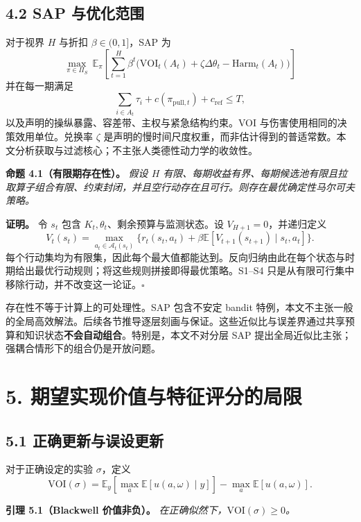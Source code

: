 \documentclass[
  chinese,
  11pt]{article}
\begin{document}
\subsection{4.2 SAP 与优化范围}\label{sap-ux4e0eux4f18ux5316ux8303ux56f4}

对于视界 \(H\) 与折扣 \(\beta\in(0,1]\)，SAP 为 \[
\max_{\pi\in\Pi_S}\ \mathbb E_\pi\!\left[\sum_{t=1}^{H}\beta^t
\big(\mathrm{VOI}_t(A_t)+\zeta\Delta\theta_t-\mathrm{Harm}_t(A_t)\big)\right]
\tag{1}
\] 并在每一期满足 \[
\sum_{i\in A_t}\tau_i+c(\pi_{\mathrm{pull},t})+c_{\mathrm{ref}}\leq T,
\tag{2}
\] 以及声明的操纵暴露、容差带、主权与紧急结构约束。VOI 与伤害使用相同的决策效用单位。兑换率 \(\zeta\) 是声明的慢时间尺度权重，而非估计得到的普适常数。本文分析获取与过滤核心；不主张人类德性动力学的收敛性。

\textbf{命题 4.1（有限期存在性）。} \emph{假设 \(H\) 有限、每期收益有界、每期候选池有限且拉取算子组合有限、约束封闭，并且空行动存在且可行。则存在最优确定性马尔可夫策略。}

\textbf{证明。} 令 \(s_t\) 包含 \(K_t,\theta_t\)、剩余预算与监测状态。设 \(V_{H+1}=0\)，并递归定义 \[
V_t(s_t)=\max_{a_t\in\mathcal A_t(s_t)}
\{r_t(s_t,a_t)+\beta\mathbb E[V_{t+1}(s_{t+1})\mid s_t,a_t]\}.
\] 每个行动集均为有限集，因此每个最大值都能达到。反向归纳由此在每个状态与时期给出最优行动规则；将这些规则拼接即得最优策略。S1--S4 只是从有限可行集中移除行动，并不改变这一论证。\(\square\)

存在性不等于计算上的可处理性。SAP 包含不安定 bandit 特例，本文不主张一般的全局高效解法。后续各节推导逐层刻画与保证。这些近似比与误差界通过共享预算和知识状态\textbf{不会自动组合}。特别是，本文不对分层 SAP 提出全局近似比主张；强耦合情形下的组合仍是开放问题。

\section{5. 期望实现价值与特征评分的局限}\label{ux671fux671bux5b9eux73b0ux4ef7ux503cux4e0eux7279ux5f81ux8bc4ux5206ux7684ux5c40ux9650}

\subsection{5.1 正确更新与误设更新}\label{ux6b63ux786eux66f4ux65b0ux4e0eux8befux8bbeux66f4ux65b0}

对于正确设定的实验 \(\sigma\)，定义 \[
\mathrm{VOI}(\sigma)=\mathbb E_y\!\left[\max_a\mathbb E[u(a,\omega)\mid y]\right]
-\max_a\mathbb E[u(a,\omega)].
\]

\textbf{引理 5.1（Blackwell 价值非负）。} \emph{在正确似然下，\(\mathrm{VOI}(\sigma)\geq0\)。}
\end{document}

